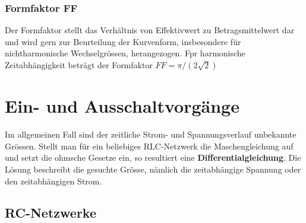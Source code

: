 \subsubsection{Formfaktor FF}
Der Formfaktor stellt das Verhältnis von Effektivwert zu Betragsmittelwert dar und wird gern zur Beurteilung der Kurvenform, insbesondere für nichtharmonische Wechselgrössen, herangezogen. Fpr harmonische Zeitabhängigkeit beträgt der Formfaktor $FF=\pi/(2\sqrt{2})$
\section{Ein- und Ausschaltvorgänge}
Im allgemeinen Fall sind der zeitliche Strom- und Spannungsverlauf unbekannte Grössen. Stellt man für ein beliebiges RLC-Netzwerk die Maschengleichung auf und setzt die ohmsche Gesetze ein, so resultiert eine \textbf{Differentialgleichung}. Die Lösung beschreibt die gesuchte Grösse, nämlich die zeitabhängige Spannung oder den zeitabhängigen Strom.
\subsection{RC-Netzwerke}














